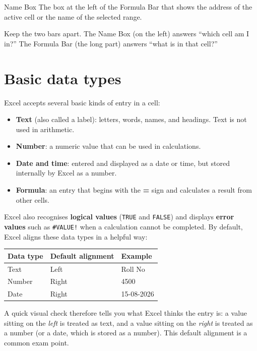 \begin{definitionbox}{Name Box}
The box at the left of the Formula Bar that shows the address of the active
cell or the name of the selected range.
\end{definitionbox}

Keep the two bars apart. The Name Box (on the left) answers ``which cell
am I in?'' The Formula Bar (the long part) answers ``what is in that
cell?''

\section{Basic data types}
Excel accepts several basic kinds of entry in a cell:

\begin{itemize}
  \item \textbf{Text} (also called a label): letters, words, names, and
    headings. Text is not used in arithmetic.
  \item \textbf{Number}: a numeric value that can be used in calculations.
  \item \textbf{Date and time}: entered and displayed as a date or time, but
    stored internally by Excel as a number.
  \item \textbf{Formula}: an entry that begins with the \textbf{=} sign and
    calculates a result from other cells.
\end{itemize}

Excel also recognises \textbf{logical values} (\texttt{TRUE} and
\texttt{FALSE}) and displays \textbf{error values} such as
\texttt{\#VALUE!} when a calculation cannot be completed. By default, Excel
aligns these data types in a helpful way:

\begin{center}
\begin{tabular}{lll}
\toprule
\textbf{Data type} & \textbf{Default alignment} & \textbf{Example} \\
\midrule
Text & Left & Roll No \\
Number & Right & 4500 \\
Date & Right & 15-08-2026 \\
\bottomrule
\end{tabular}
\end{center}

A quick visual check therefore tells you what Excel thinks the entry is: a
value sitting on the \emph{left} is treated as text, and a value sitting on
the \emph{right} is treated as a number (or a date, which is stored as a
number). This default alignment is a common exam point.

